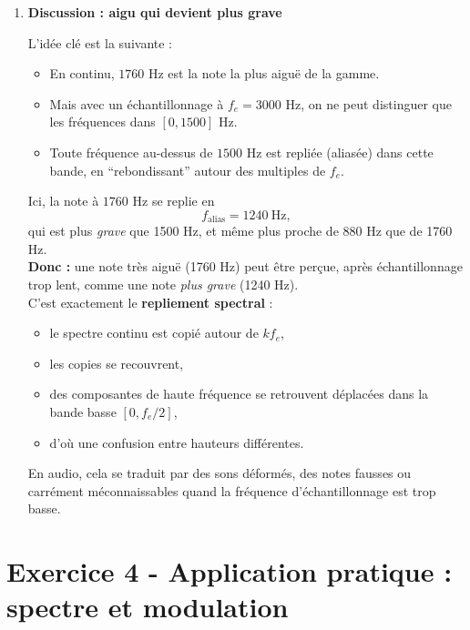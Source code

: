 \begin{enumerate}[label=(\alph*)]
\medskip
\noindent
\textit{Résumé :} après échantillonnage à 3 kHz, les fréquences effectivement observées dans le signal échantillonné sont :
\[
220,\ 440,\ 880,\ \text{et } 1240\ \text{Hz}
\]
au lieu de
\[
220,\ 440,\ 880,\ 1760\ \text{Hz}.
\]

\item \textbf{Discussion : aigu qui devient plus grave}

L'idée clé est la suivante :

\begin{itemize}
    \item En continu, $1760$ Hz est la note la plus aiguë de la gamme.
    \item Mais avec un échantillonnage à $f_e = 3000$ Hz, on ne peut distinguer que les fréquences dans $[0,1500]$ Hz.
    \item Toute fréquence au-dessus de $1500$ Hz est repliée (aliasée) dans cette bande, en ``rebondissant'' autour des multiples de $f_e$.
\end{itemize}

Ici, la note à $1760$ Hz se replie en
\[
f_{\text{alias}} = 1240\ \text{Hz},
\]
qui est plus \emph{grave} que 1500 Hz, et même plus proche de 880 Hz que de 1760 Hz. \\

\textbf{Donc :} une note très aiguë (1760 Hz) peut être perçue, après échantillonnage trop lent, comme une note \emph{plus grave} (1240 Hz).  \\

C’est exactement le \textbf{repliement spectral} :
\begin{itemize}
    \item le spectre continu est copié autour de $k f_e$,
    \item les copies se recouvrent,
    \item des composantes de haute fréquence se retrouvent déplacées dans la bande basse $[0,f_e/2]$,
    \item d’où une confusion entre hauteurs différentes. \\
\end{itemize}

En audio, cela se traduit par des sons déformés, des notes fausses ou carrément méconnaissables quand la fréquence d’échantillonnage est trop basse.

\end{enumerate}


\newpage
\section*{Exercice 4 - Application pratique : spectre et modulation}


